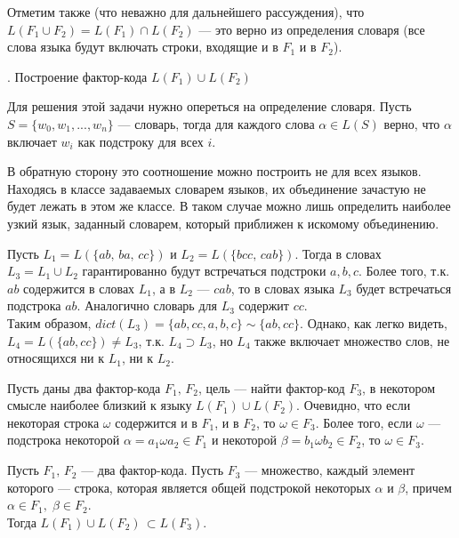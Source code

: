 \documentclass[14pt, russian]{scrartcl}
\begin{document}
Отметим также (что неважно для дальнейшего рассуждения), что $L(F_1 \cup F_2) = L(F_1) \cap L(F_2)$ --- это верно из определения словаря (все слова языка будут включать строки, входящие и в $F_1$ и в $F_2$).


\vspace{10pt}
{. Построение фактор-кода $L(F_1) \cup L(F_2)$

}

\vspace{4pt}

Для решения этой задачи нужно опереться на определение словаря. Пусть $S = \{w_0, w_1, ..., w_n\}$ --- словарь, тогда для каждого слова $\alpha \in L(S)$ верно, что $\alpha$ включает $w_i$ как подстроку для всех $i$.

В обратную сторону это соотношение можно построить не для всех языков. Находясь в классе задаваемых словарем языков, их объединение зачастую не будет лежать в этом же классе. В таком случае можно лишь определить наиболее узкий язык, заданный словарем, который приближен к искомому объединению.

\begin{Example}
    Пусть $L_1 = L(\{ab,\, ba,\, cc\})$ и  $L_2 = L(\{bcc,\, cab\})$.
    Тогда в словах $L_3 = L_1 \cup L_2$ гарантированно будут встречаться подстроки $a, b, c$. Более того, т.к. $ab$ содержится в словах $L_1$, а в $L_2$ --- $cab$, то в словах языка $L_3$ будет встречаться подстрока $ab$. Аналогично словарь для $L_3$ содержит $cc$. \\
    Таким образом, $dict(L_3) = \{ab, cc, a, b, c\} \sim \{ab, cc\}$. Однако, как легко видеть, $L_4 =L(\{ab, cc\}) \neq L_3$, т.к. $L_4 \supset L_3$, но $L_4$ также включает множество слов, не относящихся ни к $L_1$, ни к $L_2$.   
\end{Example}

Пусть даны два фактор-кода $F_1, \, F_2$, цель --- найти фактор-код $F_3$, в некотором смысле наиболее близкий к языку $L(F_1) \cup L(F_2)$.
Очевидно, что если некоторая строка $\omega$ содержится и в $F_1$, и в $F_2$, то $\omega \in F_3$. Более того, если $\omega$ --- подстрока некоторой $\alpha = a_1\omega a_2 \in F_1 $ и некоторой $\beta = b_1 \omega b_2 \in F_2$, то $\omega \in F_3$.

\begin{Statement}
    Пусть $F_1, \, F_2$ --- два фактор-кода. Пусть $F_3$ --- множество, каждый элемент которого --- строка, которая является общей подстрокой некоторых $\alpha$ и $\beta$, причем $\alpha \in F_1 ,\; \beta \in F_2$. 
    \\
    Тогда $L(F_1) \cup L(F_2) \, \subset L(F_3)$.
\end{Statement}
\end{document}
